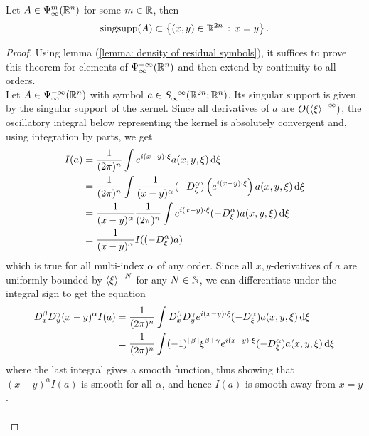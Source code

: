 \documentclass[12pt]{article}
\begin{document}
\begin{fprop}
    Let $A \in \Psi^m_\infty(\R^n)$ for some $m \in \R$, then
    \[
    \mathrm{sing supp}(A) \subset \set{(x, y) \in \R^{2n} \wh x = y}. 
    \]
\end{fprop}
\begin{proof}
    Using lemma (\ref{lemma: density of residual symbols}), it suffices to prove this theorem for elements of $\Psi^{-\infty}_\infty(\R^n)$ and then extend by continuity to all orders. \\
    
    Let $A \in \Psi^{-\infty}_\infty(\R^n)$ with symbol $a \in S^{-\infty}_\infty(\R^{2n}; \R^n)$. Its singular support is given by the singular support of the kernel. Since all derivatives of $a$ are $O(\sym[\xi]^{-\infty})$, the oscillatory integral below representing the kernel is absolutely convergent  and, using integration by parts, we get
    \begin{align*}
        I(a) 
        & = \frac{1}{(2\pi)^n} \int e^{i(x - y) \cdot \xi} a(x, y, \xi) \d[\xi] \\
        & = \frac{1}{(2\pi)^n}  \int \frac{1}{(x - y)^\alpha} (-D^\alpha_\xi) \brac{e^{i(x - y) \cdot \xi} }a(x, y, \xi) \d[\xi] \\
        & = \frac{1}{(x - y)^\alpha} \frac{1}{(2\pi)^n} \int e^{i(x - y) \cdot \xi} (-D^\alpha_\xi) a(x, y, \xi) \d[\xi] \\
        & = \frac{1}{(x - y)^\alpha} I((-D^\alpha_\xi)a)
    \end{align*}
    which is true for all multi-index $\alpha$ of any order. Since all $x, y$-derivatives of $a$ are uniformly bounded by $\sym[\xi]^{-N}$ for any $N \in \N$, we can differentiate under the integral sign to get the equation
    \begin{align*}
        D^\beta_x D^\gamma_y (x - y)^\alpha I(a) 
        & = \frac{1}{(2\pi)^n} \int D^\beta_x D^\gamma_y e^{i(x - y) \cdot \xi} (-D^\alpha_\xi) a(x, y, \xi) \d[\xi] \\
        & = \frac{1}{(2\pi)^n} \int (-1)^{\abs{\beta}}\xi^{\beta + \gamma}e^{i(x - y) \cdot \xi} (-D^\alpha_\xi) a(x, y, \xi) \d[\xi] \\
    \end{align*}
    where the last integral gives a smooth function, thus showing that $(x - y)^\alpha I(a)$ is smooth for all $\alpha$, and hence $I(a)$ is smooth away from $x = y$. \\
    \\
%    
%    
\end{proof}
\end{document}
